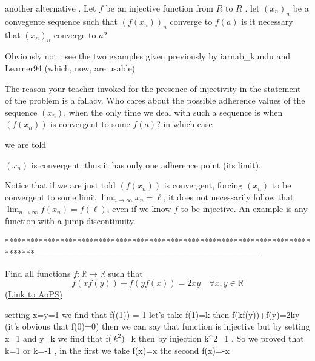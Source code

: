 \begin{solution}
	\begin{tcolorbox}another alternative .
Let $f$ be an injective function from $R$ to $R$ .
let $(x_n)_n$ be a convegente sequence such that $(f(x_n))_n$ converge to $f(a)$
is it necessary that $(x_n)_n$ converge to $a ?$\end{tcolorbox}
Obviously not : see the two examples given previously by iarnab_kundu and Learner94 (which, now, are usable)
\end{solution}



\begin{solution}
	The reason your teacher invoked for the presence of injectivity in the statement of the problem is a fallacy. Who cares about the possible adherence values of the sequence $(x_n)$, when the only time we deal with such a sequence is when $(f(x_n))$ is convergent to some $f(a)$? in which case \begin{bolded}we are told \end{bolded}$(x_n)$ is convergent, thus it has only one adherence point (its limit).

Notice that if we are just told $(f(x_n))$ is convergent, forcing $(x_n)$ to be convergent to some limit $\lim_{n\to \infty} x_n =\ell$, it does not necessarily follow that $\lim_{n\to \infty} f(x_n) =f(\ell)$, even if we know $f$ to be injective. An example is any function with a jump discontinuity.
\end{solution}
*******************************************************************************
-------------------------------------------------------------------------------

\begin{problem}
	Find all functions $f:\mathbb R\to \mathbb R$ such that 
\[f(xf(y))+f(yf(x))=2xy \quad \forall x,y\in \mathbb R\]
	\flushright \href{https://artofproblemsolving.com/community/q1h570625}{(Link to AoPS)}
\end{problem}



\begin{solution}
	setting x=y=1 we find that f((1)) = 1 let's take f(1)=k then 
f(kf(y))+f(y)=2ky (it's obvious that f(0)=0)  then we can say that function is injective  but
by setting x=1 and y=k we find that f($\ k^2$)=k then by injection k^2=1 . So we proved that k=1 or k=-1 , in the first we take f(x)=x the second f(x)=-x
\end{solution}



